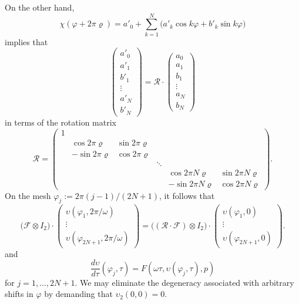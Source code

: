 On the other hand,
\begin{equation}
\chi(\varphi+2\pi\varrho)=a'_0+\sum_{k=1}^N \bigg(a'_k\cos k\varphi+b'_k\sin k\varphi\bigg)
\end{equation}
implies that
\begin{equation}
\left(\begin{array}{c}a'_0\\a'_1\\b'_1\\\vdots\\a'_N\\b'_N\end{array}\right)=\mathcal{R}\cdot\left(\begin{array}{c}a_0\\a_1\\b_1\\\vdots\\a_N\\b_N\end{array}\right)
\end{equation}
in terms of the rotation matrix
\begin{equation}
\mathcal{R}=\left(\begin{array}{cccccc}1 & & & & &\\& \cos 2\pi\varrho & \sin 2\pi\varrho  & & &\\& -\sin 2\pi\varrho & \cos 2\pi\varrho & & &\\& & & \ddots & &\\& & & & \cos 2\pi N\varrho & \sin 2\pi N\varrho\\ & & & & -\sin 2\pi N\varrho & \cos 2\pi N\varrho\end{array}\right).
\end{equation}
On the mesh $\varphi_j:=2\pi(j-1)/(2N+1)$, it follows that
\begin{equation}
\big(\mathcal{F}\otimes I_2\big)\cdot\left(\begin{array}{c}
\upsilon\left(\varphi_1,2\pi/\omega\right)\\
\vdots\\
\upsilon\left(\varphi_{2N+1},2\pi/\omega\right)\end{array}\right)=\big(\left(\mathcal{R}\cdot \mathcal{F}\right)\otimes I_2\big)\cdot \left(\begin{array}{c}\upsilon\left(\varphi_1,0\right)\\
\vdots\\
\upsilon\left(\varphi_{2N+1},0\right)\end{array}\right).
\label{eq: fourbc}
\end{equation}
and
\begin{equation}
\frac{d\upsilon}{d\tau}\left(\varphi_j,\tau\right)=F\left(\omega\tau,\upsilon\left(\varphi_j,\tau\right),p\right)
\end{equation}
for $j=1,\ldots,2N+1$. We may eliminate the degeneracy associated with arbitrary shifts in $\varphi$ by demanding that $\upsilon_2(0,0)=0$.

